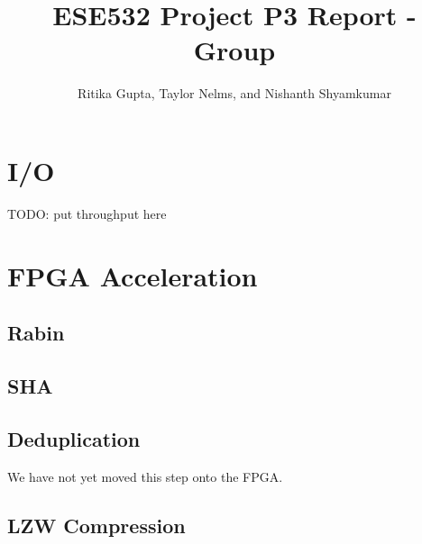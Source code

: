 \documentclass{article}
\title{ESE532 Project P3 Report - Group}
\author{Ritika Gupta, Taylor Nelms, and Nishanth Shyamkumar}
\begin{document}
\maketitle


\section{I/O}

TODO: put throughput here

\section{FPGA Acceleration}

\subsection{Rabin}

\subsection{SHA}

\subsection{Deduplication}

We have not yet moved this step onto the FPGA.

\subsection{LZW Compression}
\end{document}
